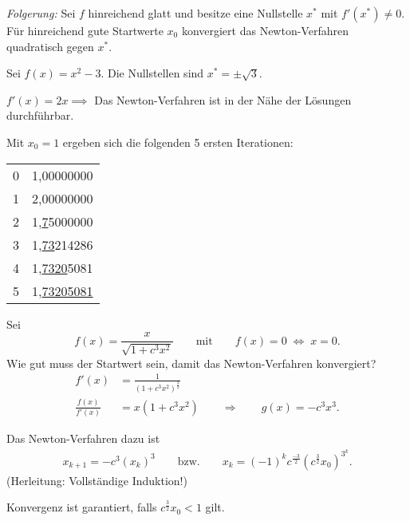 \bigskip

\emph{Folgerung:} Sei $f$ hinreichend glatt und besitze eine Nullstelle $x^*$ mit $f'(x^*) \neq 0$.
Für hinreichend gute Startwerte $x_0$ konvergiert das Newton-Verfahren quadratisch gegen $x^*$.

\bigskip

\begin{bsp}
Sei $f(x)=x^2-3$. Die Nullstellen sind $x^*=\pm \sqrt{3}$.

\medskip

$f'(x)=2x \implies$ Das Newton-Verfahren ist in der Nähe der Lösungen durchführbar.

\medskip

Mit $x_0=1$ ergeben sich die folgenden 5 ersten Iterationen:
\begin{center}
\begin{tabular}{l | r}
 0 & 1{,}00000000 \\
 1 & 2{,}00000000 \\
 2 & 1{,}\underline{7}5000000 \\
 3 & 1{,}\underline{73}214286 \\
 4 & 1{,}\underline{7320}5081 \\
 5 & 1{,}\underline{73205081}
\end{tabular}
\end{center}
\end{bsp}

\bigskip

\begin{bsp}
Sei
\begin{equation*}
 f(x) =\frac{x}{\sqrt{1+c^3x^2}}
 \qquad
 \text{mit}
 \qquad
 f(x)=0 \; \Leftrightarrow \; x=0.
\end{equation*}
Wie gut muss der Startwert sein, damit das Newton-Verfahren konvergiert?
\begin{align*}
 f'(x) & = \frac{1}{(1+c^3x^2)^{\frac{3}{2}}} \\
 \frac{f(x)}{f'(x)} & = x (1+c^3x^2)
 \qquad \Longrightarrow \qquad g(x)=-c^3x^3.
\end{align*}

\medskip

Das Newton-Verfahren dazu ist
\begin{align*}
 x_{k+1} = -c^3 (x_k)^3
 \qquad \text{bzw.} \qquad
 x_k = (-1)^kc^{\frac{-3}{2}} (c^{\frac{3}{2}}x_0)^{3^k}.
\end{align*}
(Herleitung: Vollständige Induktion!)

\medskip

Konvergenz ist garantiert, falls $c^{\frac{3}{2}}x_0<1$ gilt.
\end{bsp}

